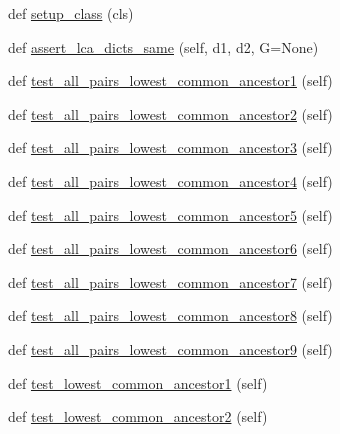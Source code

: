 \begin{DoxyCompactItemize}
\item 
def \hyperlink{classnetworkx_1_1algorithms_1_1tests_1_1test__lowest__common__ancestors_1_1TestDAGLCA_a567da01aa6193abf760fcd491cb8d41d}{setup\+\_\+class} (cls)
\item 
def \hyperlink{classnetworkx_1_1algorithms_1_1tests_1_1test__lowest__common__ancestors_1_1TestDAGLCA_ab26e53de613887ec15bd4929886eb430}{assert\+\_\+lca\+\_\+dicts\+\_\+same} (self, d1, d2, G=None)
\item 
def \hyperlink{classnetworkx_1_1algorithms_1_1tests_1_1test__lowest__common__ancestors_1_1TestDAGLCA_ade47d9707cfa559452a81df50840899c}{test\+\_\+all\+\_\+pairs\+\_\+lowest\+\_\+common\+\_\+ancestor1} (self)
\item 
def \hyperlink{classnetworkx_1_1algorithms_1_1tests_1_1test__lowest__common__ancestors_1_1TestDAGLCA_a26194bfee6f2bc2559053a50b5945b55}{test\+\_\+all\+\_\+pairs\+\_\+lowest\+\_\+common\+\_\+ancestor2} (self)
\item 
def \hyperlink{classnetworkx_1_1algorithms_1_1tests_1_1test__lowest__common__ancestors_1_1TestDAGLCA_a7483f374a7928da24849c8dec7fbc92b}{test\+\_\+all\+\_\+pairs\+\_\+lowest\+\_\+common\+\_\+ancestor3} (self)
\item 
def \hyperlink{classnetworkx_1_1algorithms_1_1tests_1_1test__lowest__common__ancestors_1_1TestDAGLCA_a91348fd435c6c3073589248251db4b5b}{test\+\_\+all\+\_\+pairs\+\_\+lowest\+\_\+common\+\_\+ancestor4} (self)
\item 
def \hyperlink{classnetworkx_1_1algorithms_1_1tests_1_1test__lowest__common__ancestors_1_1TestDAGLCA_a0f629c0ce7332a311d3ac8754b3d4b0a}{test\+\_\+all\+\_\+pairs\+\_\+lowest\+\_\+common\+\_\+ancestor5} (self)
\item 
def \hyperlink{classnetworkx_1_1algorithms_1_1tests_1_1test__lowest__common__ancestors_1_1TestDAGLCA_adeed458aaf45824033b888f5b4e122a9}{test\+\_\+all\+\_\+pairs\+\_\+lowest\+\_\+common\+\_\+ancestor6} (self)
\item 
def \hyperlink{classnetworkx_1_1algorithms_1_1tests_1_1test__lowest__common__ancestors_1_1TestDAGLCA_abea21f669ee53eb8088d21e92d9e0d4b}{test\+\_\+all\+\_\+pairs\+\_\+lowest\+\_\+common\+\_\+ancestor7} (self)
\item 
def \hyperlink{classnetworkx_1_1algorithms_1_1tests_1_1test__lowest__common__ancestors_1_1TestDAGLCA_afb25e88e2d885340947cfceb38046115}{test\+\_\+all\+\_\+pairs\+\_\+lowest\+\_\+common\+\_\+ancestor8} (self)
\item 
def \hyperlink{classnetworkx_1_1algorithms_1_1tests_1_1test__lowest__common__ancestors_1_1TestDAGLCA_a8df7a784acfdcb46619d60677396771f}{test\+\_\+all\+\_\+pairs\+\_\+lowest\+\_\+common\+\_\+ancestor9} (self)
\item 
def \hyperlink{classnetworkx_1_1algorithms_1_1tests_1_1test__lowest__common__ancestors_1_1TestDAGLCA_ad95a1f9698dd60d929f1472c39190c24}{test\+\_\+lowest\+\_\+common\+\_\+ancestor1} (self)
\item 
def \hyperlink{classnetworkx_1_1algorithms_1_1tests_1_1test__lowest__common__ancestors_1_1TestDAGLCA_ae9d53ad8d202757d48718a431f00d60a}{test\+\_\+lowest\+\_\+common\+\_\+ancestor2} (self)
\end{DoxyCompactItemize}
